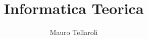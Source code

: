 \documentclass[a4paper]{article}
\begin{document}
\title{Informatica Teorica}
\author{Mauro Tellaroli}
\date{}
\maketitle

\tableofcontents
\clearpage

\setcounter{section}{-1}

\clearpage

\clearpage

\clearpage
\end{document}
